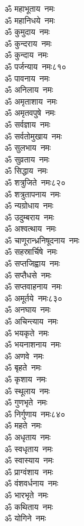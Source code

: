 \begin{multicols}{2}
\begin{flushleft}
ॐ महाभूताय~नमः\\
ॐ महानिधये~नमः\\
ॐ कुमुदाय~नमः\\
ॐ कुन्दराय~नमः\\
ॐ कुन्दाय~नमः\\
ॐ पर्जन्याय~नमः\hfill ८१०\\
ॐ पावनाय~नमः\\
ॐ अनिलाय~नमः\\
ॐ अमृताशाय~नमः\\
ॐ अमृतवपुषे~नमः\\
ॐ सर्वज्ञाय~नमः\\
ॐ सर्वतोमुखाय~नमः\\
ॐ सुलभाय~नमः\\
ॐ सुव्रताय~नमः\\
ॐ सिद्धाय~नमः\\
ॐ शत्रुजिते~नमः\hfill ८२०\\
ॐ शत्रुतापनाय~नमः\\
ॐ न्यग्रोधाय~नमः\\
ॐ उदुम्बराय~नमः\\
ॐ अश्वत्थाय~नमः\\
ॐ चाणूरान्ध्रनिषूदनाय~नमः\\
ॐ सहस्रार्चिषे~नमः\\
ॐ सप्तजिह्वाय~नमः\\
ॐ सप्तैधसे~नमः\\
ॐ सप्तवाहनाय~नमः\\
ॐ अमूर्तये~नमः\hfill ८३०\\
ॐ अनघाय~नमः\\
ॐ अचिन्त्याय~नमः\\
ॐ भयकृते~नमः\\
ॐ भयनाशनाय~नमः\\
ॐ अणवे~नमः\\
ॐ बृहते~नमः\\
ॐ कृशाय~नमः\\
ॐ स्थूलाय~नमः\\
ॐ गुणभृते~नमः\\
ॐ निर्गुणाय~नमः\hfill ८४०\\
ॐ महते~नमः\\
ॐ अधृताय~नमः\\
ॐ स्वधृताय~नमः\\
ॐ स्वास्याय~नमः\\
ॐ प्राग्वंशाय~नमः\\
ॐ वंशवर्धनाय~नमः\\
ॐ भारभृते~नमः\\
ॐ कथिताय~नमः\\
ॐ योगिने~नमः\\

\end{flushleft}
\end{multicols}
